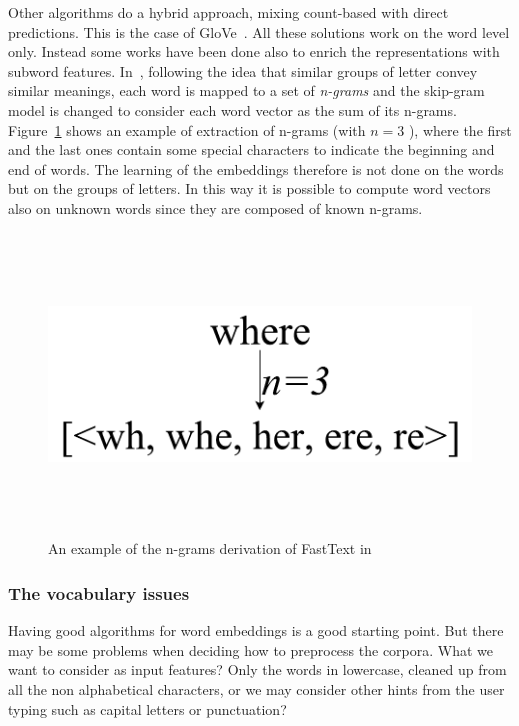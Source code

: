 Other algorithms do a hybrid approach, mixing count-based with direct predictions. This is the case of GloVe~\cite{pennington2014glove}. All these solutions work on the word level only. Instead some works have been done also to enrich the representations with subword features. In~\cite{bojanowski2016enriching}, following the idea that similar groups of letter convey similar meanings, each word is mapped to a set of \textit{n-grams} and the skip-gram model is changed to consider each word vector as the sum of its n-grams. Figure~\ref{fig:fastText} shows an example of extraction of n-grams (with  \( n=3 \) ), where the first and the last ones contain some special characters to indicate the beginning and end of words. The learning of the embeddings therefore is not done on the words but on the groups of letters. In this way it is possible to compute word vectors also on unknown words since they are composed of known n-grams.

\begin{figure}[!htbp]
    \centering
    \includegraphics[max width=\linewidth,max height=8cm,keepaspectratio]{figures/fastText}
    \caption{An example of the n-grams derivation of FastText in~\cite{bojanowski2016enriching}}\label{fig:fastText}
\end{figure}

\subsubsection{The vocabulary issues}
\label{soaVocabulary}

Having good algorithms for word embeddings is a good starting point. But there may be some problems when deciding how to preprocess the corpora. What we want to consider as input features? Only the words in lowercase, cleaned up from all the non alphabetical characters, or we may consider other hints from the user typing such as capital letters or punctuation?

